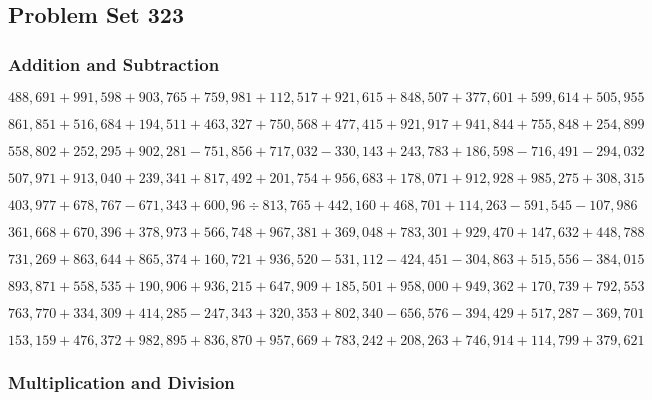 \hypertarget{problem-set-323}{%
\subsection{Problem Set 323}\label{problem-set-323}}

\hypertarget{addition-and-subtraction}{%
\subsubsection{Addition and
Subtraction}\label{addition-and-subtraction}}

\(488,691+991,598+903,765+759,981+112,517+921,615+848,507+377,601+599,614+505,955\)

\(861,851+516,684+194,511+463,327+750,568+477,415+921,917+941,844+755,848+254,899\)

\(558,802+252,295+902,281-751,856+717,032-330,143+243,783+186,598-716,491-294,032\)

\(507,971+913,040+239,341+817,492+201,754+956,683+178,071+912,928+985,275+308,315\)

\(403,977+678,767-671,343+600,96÷813,765+442,160+468,701+114,263-591,545-107,986\)

\(361,668+670,396+378,973+566,748+967,381+369,048+783,301+929,470+147,632+448,788\)

\(731,269+863,644+865,374+160,721+936,520-531,112-424,451-304,863+515,556-384,015\)

\(893,871+558,535+190,906+936,215+647,909+185,501+958,000+949,362+170,739+792,553\)

\(763,770+334,309+414,285-247,343+320,353+802,340-656,576-394,429+517,287-369,701\)

\(153,159+476,372+982,895+836,870+957,669+783,242+208,263+746,914+114,799+379,621\)

\hypertarget{multiplication-and-division}{%
\subsubsection{Multiplication and
Division}\label{multiplication-and-division}}

